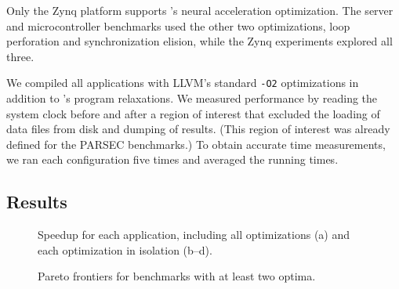 Only the Zynq platform supports \sysname's neural acceleration optimization.
The server and microcontroller benchmarks used the other two optimizations,
loop perforation and synchronization elision, while the Zynq experiments
explored all three.

We compiled all applications with LLVM's standard \texttt{-O2} optimizations
in addition to \sysname's program relaxations.
%
We measured performance by reading the system clock before and after a
region of interest that excluded the
loading of data files from disk and dumping of results. (This region of
interest was already defined for the PARSEC benchmarks.)
To obtain accurate time measurements, we ran each configuration five times and
averaged the running times.


\subsection{Results}
\label{accept:sec:results}

\begin{figure}
\centering
{}
\caption{Speedup for each application, including all
optimizations (a) and each optimization in isolation (b--d).}
\label{accept:fig:performance}
\end{figure}

\begin{figure}
\centering

\caption{Pareto frontiers for benchmarks with at least two optima.}
\label{accept:fig:frontier}
\end{figure}

